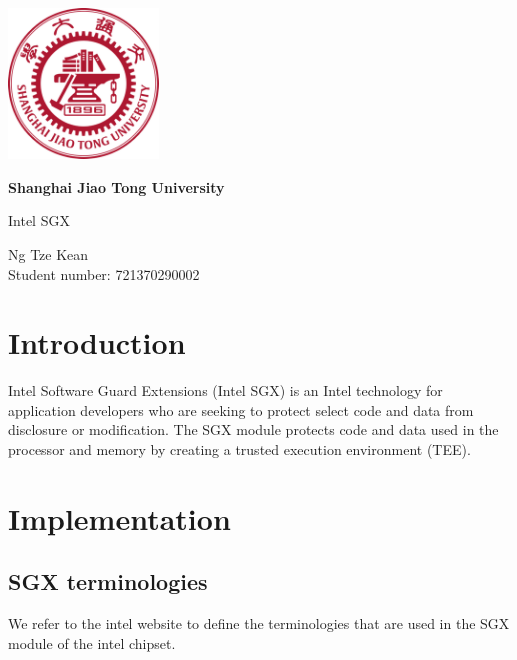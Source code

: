 \documentclass{article}
\begin{document}
\begin{titlepage}
      \begin{center}
            \vfill

            \includegraphics[width=4cm]{sjtu.png}

            \vspace{1cm}

            \textbf{\huge Shanghai Jiao Tong University}

            \vspace{0.5cm}

            {\large Intel SGX}

            \vspace{1.5cm}

            Ng Tze Kean\\Student number: 721370290002

      \end{center}
\end{titlepage}

\section*{Introduction}

Intel Software Guard Extensions (Intel SGX) is an Intel technology for
application developers who are seeking to protect select code and data from
disclosure or modification. The SGX module protects code and data used in the
processor and memory by creating a trusted execution environment (TEE).

\section*{Implementation}

\subsection*{SGX terminologies}

We refer to the intel website to define the terminologies that are used in the
SGX module of the intel chipset.
\end{document}
